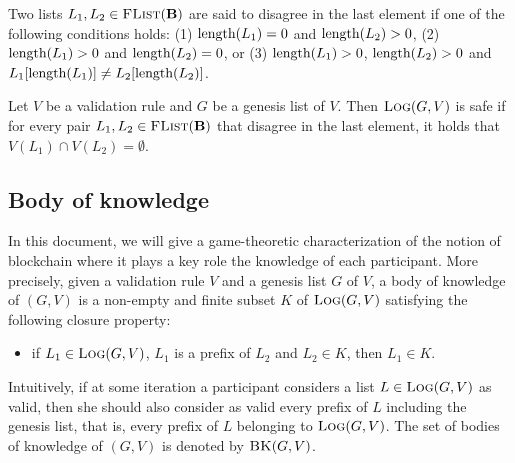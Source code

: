 %
%

Two lists $L_1, L_2 \in \text{\sc FList}(\text{\bf B})$ are said to disagree in the last element if one of the following conditions holds: (1) $\text{\rm length}(L_1) = 0$ and $\text{\rm length}(L_2) > 0$, (2) $\text{\rm length}(L_1) > 0$ and $\text{\rm length}(L_2) = 0$, or (3) $\text{\rm length}(L_1) > 0$, $\text{\rm length}(L_2) > 0$ and $L_1[\text{\rm length}(L_1)] \neq L_2[\text{\rm length}(L_2)]$.
\begin{mydef}
	Let $V$ be a validation rule and $G$ be a genesis list of $V$. Then $\text{\sc Log}(G,V)$ is safe if for every pair $L_1, L_2 \in \text{\sc FList}(\text{\bf B})$ that disagree in the last element, it holds that $V(L_1) \cap V(L_2) = \emptyset$.
\end{mydef}


\subsection{Body of knowledge}

In this document,  we will give a game-theoretic characterization of the notion of blockchain where it plays a key role the knowledge of each participant. More precisely, given a validation rule $V$ and a genesis list $G$ of $V$, a body of knowledge of $(G,V)$ is a non-empty and finite subset $K$ of $\text{\sc Log}(G,V)$ satisfying the following closure property:
\begin{itemize}
\item if $L_1 \in \text{\sc Log}(G,V)$, $L_1$ is a prefix of $L_2$ and $L_2 \in K$, then $L_1 \in K$.
\end{itemize}
Intuitively, if at some iteration a participant considers a list $L \in \text{\sc Log}(G,V)$ as valid, then she should also consider as valid every prefix of $L$ including the genesis list, that is, every prefix of $L$ belonging to $\text{\sc Log}(G,V)$. The set of bodies of knowledge of $(G,V)$ is denoted by $\text{\sc BK}(G,V)$. 

